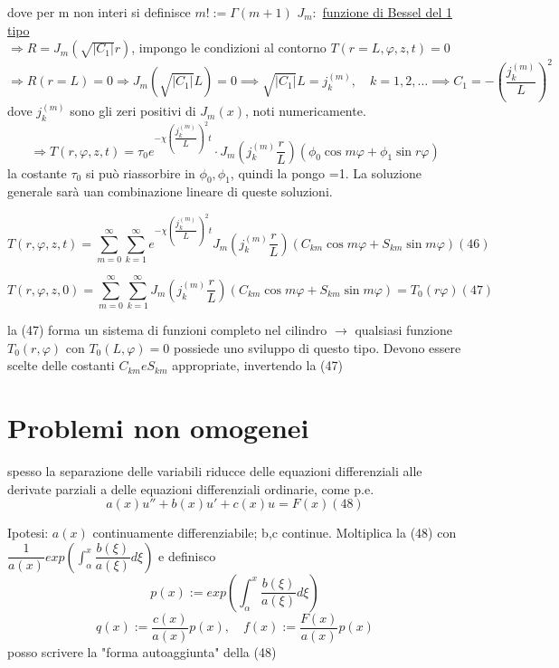 \documentclass[a4paper,11pt]{report}
\begin{document}
dove per m non interi si definisce $m!:=\Gamma(m+1)$
$J_m:$ \underline{funzione di Bessel del 1 tipo}\\
$\Rightarrow R=J_m(\sqrt{|C_1|}r)$, impongo le condizioni al contorno $
T(r=L,\varphi,z,t)=0 $
$$\Rightarrow R(r=L)=0 \Rightarrow J_m(\sqrt{|C_1|}L)=0 \implies \sqrt{|C_1|}L=j_k^{(m)}, \quad k=1,2,\dots \implies C_1=-\left(\dfrac{j_k^{(m)}}{L}\right)^2
$$
dove $j_k^{(m)}$ sono gli zeri positivi di $J_m(x)$, noti numericamente.
$$
\Rightarrow T(r,\varphi,z,t)=\tau_0e^{-\chi \left(\dfrac{j_k^{(m)}}{L}\right)^2 t}\cdot J_m\left(j_k^{(m)}\dfrac{r}{L}\right)(\phi_0\cos m\varphi + \phi_1 \sin r\varphi)
$$
la costante $\tau_0$ si può riassorbire in $\phi_0,\phi_1$, quindi la pongo =1. La soluzione generale sarà uan combinazione lineare di queste soluzioni.

\begin{equation}
T(r,\varphi,z,t)=\sum_{m=0}^{\infty}\sum_{k=1}^\infty e^{-\chi\left(\dfrac{j_k^{(m)}}{L}\right)^2t}J_m\left(j_k^{(m)}\dfrac{r}{L}\right)(C_{km}\cos m\varphi + S_{km}\sin m\varphi) (46)
\end{equation}

\begin{equation}
T(r,\varphi,z,0)=\sum_{m=0}^{\infty}\sum_{k=1}^\infty J_m\left(j_k^{(m)}\dfrac{r}{L}\right)(C_{km}\cos m\varphi + S_{km}\sin m\varphi)=T_0(r\varphi) (47)
\end{equation}

la (47) forma un sistema di funzioni completo nel cilindro $\rightarrow$ qualsiasi funzione $T_0(r,\varphi)$ con $T_0(L,\varphi)=0$ possiede uno sviluppo di questo tipo. Devono essere scelte delle costanti $C_{km} e S_{km}$ appropriate, invertendo la (47) 

\section{Problemi non omogenei}
spesso la separazione delle variabili riducce delle equazioni differenziali alle derivate parziali a delle equazioni differenziali ordinarie, come p.e.
\begin{equation}
a(x)u'' + b(x)u'+c(x)u=F(x) (48)
\end{equation}

Ipotesi: $a(x)$ continuamente differenziabile; b,c continue. Moltiplica la (48) con $\dfrac{1}{a(x)}exp\left(\int_\alpha^x\dfrac{b(\xi)}{a(\xi)}d\xi\right)$ e definisco
$$
p(x):= exp\left(\int_\alpha^x \dfrac{b(\xi)}{a(\xi)}d\xi\right)
$$
$$
q(x):=\dfrac{c(x)}{a(x)}p(x),\quad f(x):=\dfrac{F(x)}{a(x)}p(x)
$$
posso scrivere la "forma autoaggiunta" della (48)
\end{document}
